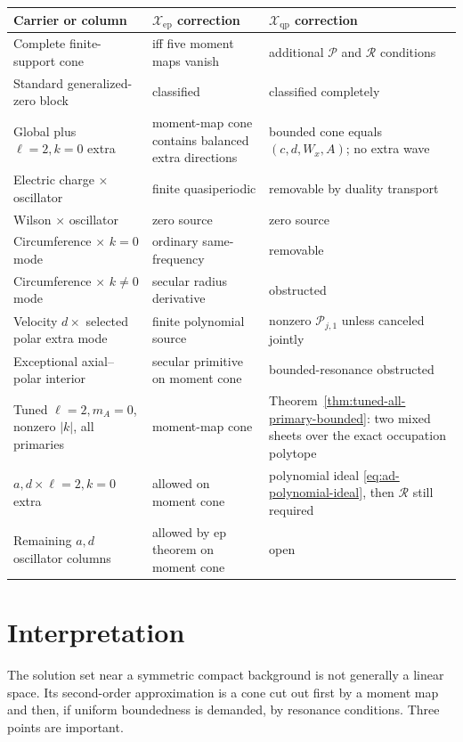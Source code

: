 \documentclass[11pt]{article}
\theoremstyle{definition}
\theoremstyle{remark}
\newcommand{\cP}{\mathcal P}
\newcommand{\cR}{\mathcal R}
\newcommand{\Xep}{\mathscr X_{\mathrm{ep}}}
\newcommand{\Xqp}{\mathscr X_{\mathrm{qp}}}
\begin{document}
\begin{center}
\begin{tabularx}{0.96\textwidth}{@{}Y Y Y@{}}
\toprule
Carrier or column & $\Xep$ correction & $\Xqp$ correction\\
\midrule
Complete finite-support cone & iff five moment maps vanish & additional
\(\cP\) and \(\cR\) conditions\\
Standard generalized-zero block & classified & classified completely\\
Global plus $\ell=2,k=0$ extra & moment-map cone contains balanced extra
directions & bounded cone equals $(c,d,W_x,A)$; no extra wave\\
Electric charge $\times$ oscillator & finite quasiperiodic & removable by
duality transport\\
Wilson $\times$ oscillator & zero source & zero source\\
Circumference $\times$ $k=0$ mode & ordinary same-frequency & removable\\
Circumference $\times$ $k\ne0$ mode & secular radius derivative & obstructed\\
Velocity $d\times$ selected polar extra mode & finite polynomial source &
nonzero $\cP_{j,1}$ unless canceled jointly\\
Exceptional axial--polar interior & secular primitive on moment cone &
bounded-resonance obstructed\\
Tuned $\ell=2,m_A=0$, nonzero $|k|$, all primaries & moment-map cone &
Theorem~\ref{thm:tuned-all-primary-bounded}: two mixed sheets over the exact
occupation polytope\\
$a,d\times\ell=2,k=0$ extra & allowed on moment cone & polynomial ideal
\eqref{eq:ad-polynomial-ideal}, then $\cR$ still required\\
Remaining $a,d$ oscillator columns & allowed by ep theorem on moment cone
& open\\
\bottomrule
\end{tabularx}
\end{center}

\section{Interpretation}

The solution set near a symmetric compact background is not generally a
linear space.  Its second-order approximation is a cone cut out first by a
moment map and then, if uniform boundedness is demanded, by resonance
conditions.  Three points are important.
\end{document}
